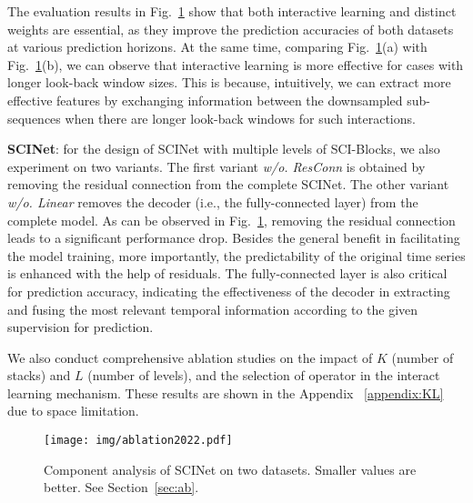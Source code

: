 \documentclass{article}
\begin{document}
The evaluation results in Fig.~\ref{fig:ab} show that both interactive learning and distinct weights are essential, as they improve the prediction accuracies of both datasets at various prediction horizons. At the same time, comparing Fig.~\ref{fig:ab}(a) with Fig.~\ref{fig:ab}(b), we can observe that interactive learning is more effective for cases with longer look-back window sizes. This is because, intuitively, we can extract more effective features by exchanging information between the downsampled sub-sequences when there are longer look-back windows for such interactions.


\vspace{5pt}
\textbf{SCINet}: for the design of SCINet with multiple levels of SCI-Blocks, we also experiment on two variants.
The first variant \emph{w/o. ResConn} is obtained by removing the residual connection from the complete SCINet. 
The other variant \emph{w/o. Linear} removes the decoder (i.e., the fully-connected layer) from the complete model. 
As can be observed in Fig.~\ref{fig:ab}, removing the residual connection leads to a significant performance drop. Besides the general benefit in facilitating the model training, more importantly, the predictability of the original time series is enhanced with the help of residuals.
The fully-connected layer is also critical for prediction accuracy, indicating the effectiveness of the decoder in extracting and fusing the most relevant temporal information according to the given supervision for prediction.

We also conduct comprehensive ablation studies on the impact of $K$ (number of stacks) and $L$ (number of levels), and the selection of operator in the interact learning mechanism. These results are shown in the Appendix ~\ref{appendix:KL} due to space limitation. 


\begin{figure}[t]	
\centering
\texttt{[image: img/ablation2022.pdf]}
\caption{Component analysis of SCINet on two datasets. Smaller values are better. See Section~\ref{sec:ab}.}
\label{fig:ab}
\end{figure}
\end{document}
